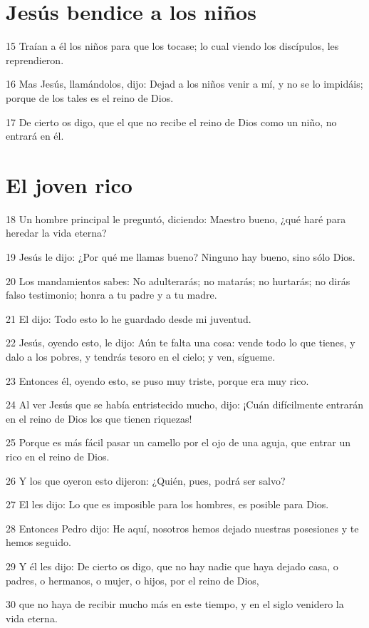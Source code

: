 \section*{Jesús bendice a los niños}

\par 15 Traían a él los niños para que los tocase; lo cual viendo los discípulos, les reprendieron.
\par 16 Mas Jesús, llamándolos, dijo: Dejad a los niños venir a mí, y no se lo impidáis; porque de los tales es el reino de Dios.
\par 17 De cierto os digo, que el que no recibe el reino de Dios como un niño, no entrará en él.

\section*{El joven rico}

\par 18 Un hombre principal le preguntó, diciendo: Maestro bueno, ¿qué haré para heredar la vida eterna?
\par 19 Jesús le dijo: ¿Por qué me llamas bueno? Ninguno hay bueno, sino sólo Dios.
\par 20 Los mandamientos sabes: No adulterarás; no matarás; no hurtarás; no dirás falso testimonio; honra a tu padre y a tu madre.
\par 21 El dijo: Todo esto lo he guardado desde mi juventud.
\par 22 Jesús, oyendo esto, le dijo: Aún te falta una cosa: vende todo lo que tienes, y dalo a los pobres, y tendrás tesoro en el cielo; y ven, sígueme.
\par 23 Entonces él, oyendo esto, se puso muy triste, porque era muy rico.
\par 24 Al ver Jesús que se había entristecido mucho, dijo: ¡Cuán difícilmente entrarán en el reino de Dios los que tienen riquezas!
\par 25 Porque es más fácil pasar un camello por el ojo de una aguja, que entrar un rico en el reino de Dios.
\par 26 Y los que oyeron esto dijeron: ¿Quién, pues, podrá ser salvo?
\par 27 El les dijo: Lo que es imposible para los hombres, es posible para Dios.
\par 28 Entonces Pedro dijo: He aquí, nosotros hemos dejado nuestras posesiones y te hemos seguido.
\par 29 Y él les dijo: De cierto os digo, que no hay nadie que haya dejado casa, o padres, o hermanos, o mujer, o hijos, por el reino de Dios,
\par 30 que no haya de recibir mucho más en este tiempo, y en el siglo venidero la vida eterna.

